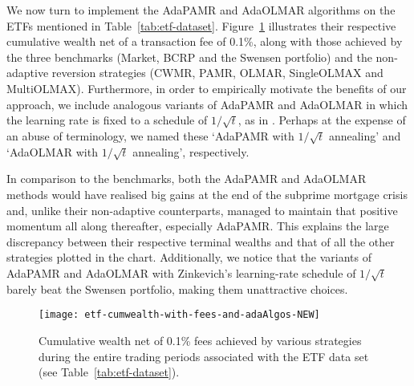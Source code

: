 \begin{mccorrection}
We now turn to implement the AdaPAMR and AdaOLMAR algorithms on the ETFs mentioned in Table~\ref{tab:etf-dataset}. Figure~\ref{fig:etf-cumwealth-with-adaAlgos} illustrates their respective cumulative wealth net of a transaction fee of 0.1\%, along with those achieved by the three benchmarks (Market, BCRP and the Swensen portfolio) and the non-adaptive reversion strategies (CWMR, PAMR, OLMAR, SingleOLMAX and MultiOLMAX). Furthermore, in order to empirically motivate the benefits of our approach, we include analogous variants of AdaPAMR and AdaOLMAR in which the learning rate is fixed to a schedule of $1/\sqrt{t}$, as in \citep{zinkevich03}. Perhaps at the expense of an abuse of terminology, we named these `AdaPAMR with $1/\sqrt{t}$ annealing' and `AdaOLMAR  with $1/\sqrt{t}$ annealing', respectively.

In comparison to the benchmarks, both the AdaPAMR and AdaOLMAR methods would have realised big gains at the end of the subprime mortgage crisis and, unlike their non-adaptive counterparts, managed to maintain that positive momentum all along thereafter, especially AdaPAMR. This explains the large discrepancy between their respective terminal wealths and that of all the other strategies plotted in the chart. Additionally, we notice that the variants of AdaPAMR and AdaOLMAR with Zinkevich's learning-rate schedule of $1/\sqrt{t}$ barely beat the Swensen portfolio, making them unattractive choices.
\end{mccorrection}
\begin{figure}[H]
\centering
\texttt{[image: etf-cumwealth-with-fees-and-adaAlgos-NEW]}
\caption{Cumulative wealth net of 0.1\% fees achieved by various strategies during the entire trading periods associated with the ETF data set (see Table~\ref{tab:etf-dataset}).}
\label{fig:etf-cumwealth-with-adaAlgos}
\end{figure}

